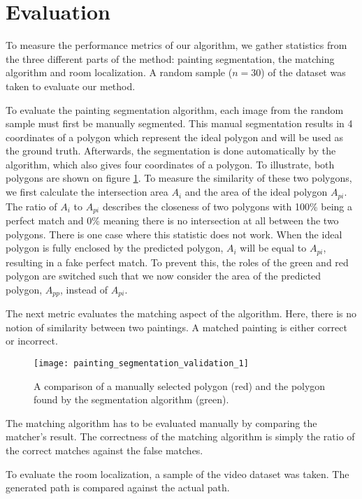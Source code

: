 \section{Evaluation}
	To measure the performance metrics of our algorithm, we gather statistics from the three different parts of the method: painting segmentation, the matching algorithm and room localization. A random sample ($n = 30$) of the dataset was taken to evaluate our method.
	
	To evaluate the painting segmentation algorithm, each image from the random sample must first be manually segmented. This manual segmentation results in 4 coordinates of a polygon which represent the ideal polygon and will be used as the ground truth. Afterwards, the segmentation is done automatically by the algorithm, which also gives four coordinates of a polygon. To illustrate, both polygons are shown on figure \ref{fig:painting_segmentation_validation_1}.
	To measure the similarity of these two polygons, we first calculate the intersection area $A_i$ and the area of the ideal polygon $A_{pi}$. The ratio of $A_i$ to $A_{pi}$ describes the closeness of two polygons with 100\% being a perfect match and 0\% meaning there is no intersection at all between the two polygons. There is one case where this statistic does not work. When the ideal polygon is fully enclosed by the predicted polygon, $A_i$ will be equal to $A_{pi}$, resulting in a fake perfect match. To prevent this, the roles of the green and red polygon are switched such that we now consider the area of the predicted polygon, $A_{pp}$, instead of $A_{pi}$.
	
	The next metric evaluates the matching aspect of the algorithm. Here, there is no notion of similarity between two paintings. A matched painting is either correct or incorrect.
	

	
	\begin{figure}
		\centering
		\texttt{[image: painting\_segmentation\_validation\_1]}
		\caption{A comparison of a manually selected polygon (red) and the polygon found by the segmentation algorithm (green).}
		\label{fig:painting_segmentation_validation_1}
	\end{figure}


	
	The matching algorithm has to be evaluated manually by comparing the matcher's result. The correctness of the matching algorithm is simply the ratio of the correct matches against the false matches.
	
	To evaluate the room localization, a sample of the video dataset was taken. The generated path is compared against the actual path.